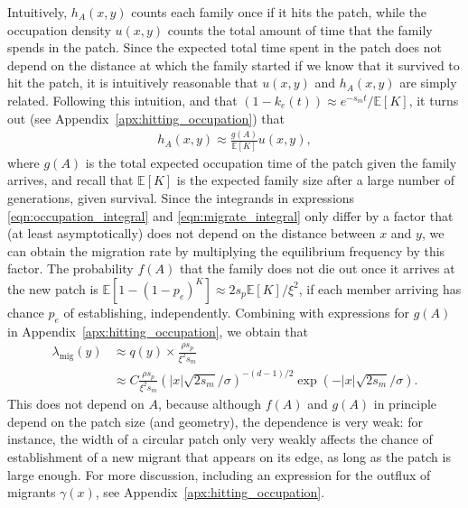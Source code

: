 \documentclass{article}
\newcommand{\E}{\mathbb{E}}
\newcommand{\migrate}{\lambda_\text{mig}}
\begin{document}
Intuitively, $h_A(x,y)$ counts each family once if it hits the patch,
while the occupation density $u(x,y)$ counts the total amount of time that the family spends in the patch.
Since the expected total time spent in the patch does not depend on the distance at which the family started
if we know that it survived to hit the patch,
it is intuitively reasonable that $u(x,y)$ and $h_A(x,y)$ are simply related.
Following this intuition,
and that $(1-k_e(t)) \approx e^{-s_m t}/\E[K]$,
it turns out (see Appendix~\ref{apx:hitting_occupation}) that
\begin{align} 
  h_A(x,y) \approx \frac{ g(A) }{ \E[K] } u(x,y),
\end{align}
where $g(A)$ is the total expected occupation time of the patch given the family arrives,
and recall that $\E[K]$ is the expected family size after a large number of generations, given survival.
Since the integrands in expressions \ref{eqn:occupation_integral} and \ref{eqn:migrate_integral} only differ by a factor
that (at least asymptotically) does not depend on the distance between $x$ and $y$,
we can obtain the migration rate by multiplying the equilibrium frequency by this factor.
The probability $f(A)$ that the family does not die out once it arrives at the new patch is
$\E[1-(1-p_e)^K] \approx 2 s_p \E[K] / \xi^2$,
if each member arriving has chance $p_e$ of establishing, independently.
Combining with expressions for $g(A)$ in Appendix~\ref{apx:hitting_occupation},
we obtain that
\begin{align}
  \label{eqn:migrate} 
  \migrate(y) &\approx q(y) \times \frac{ \rho s_p  }{ \xi^2 s_m }  \\
  &\approx C \frac{ \rho s_p  }{ \xi^2 s_m } \left( |x| \sqrt{2 s_m}/\sigma \right)^{-(d-1)/2} \exp( - |x| \sqrt{2 s_m} / \sigma) .
\end{align}
This does not depend on $A$, because although
$f(A)$ and $g(A)$ in principle depend on the patch size (and geometry),
the dependence is very weak:
for instance, the width of a circular patch only very weakly affects the chance 
of establishment of a new migrant that appears on its edge,
as long as the patch is large enough.
For more discussion, including an expression for the outflux of migrants $\gamma(x)$, see Appendix~\ref{apx:hitting_occupation}.
\end{document}
